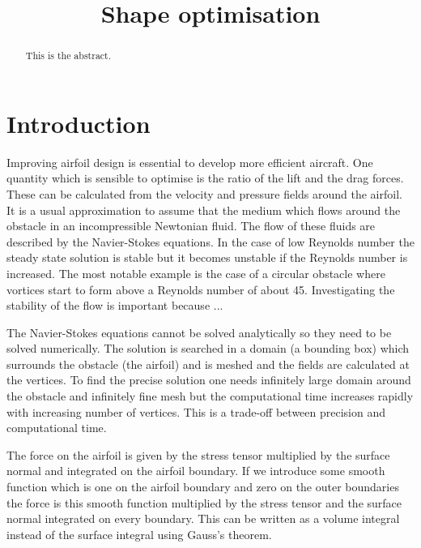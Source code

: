\documentclass[12pt, a4paper]{article}
\begin{document}
\captionsetup{justification=centering}
\title{Shape optimisation}
\maketitle
\begin{abstract}
    This is the abstract.
\end{abstract}
\section{Introduction}
        Improving airfoil design is essential to develop more efficient aircraft. One quantity which is sensible to optimise is the ratio of the lift and the drag forces. These can be calculated from the velocity and pressure fields around the airfoil. It is a usual approximation to assume that the medium which flows around the obstacle in an incompressible Newtonian fluid. The flow of these fluids are described by the Navier-Stokes equations. In the case of low Reynolds number the steady state solution is stable but it becomes unstable if the Reynolds number is increased. The most notable example is the case of a circular obstacle where vortices start to form above a Reynolds number of about 45. Investigating the stability of the flow is important because ... 
        
         The Navier-Stokes equations cannot be solved analytically so they need to be solved numerically. The solution is searched in a domain (a bounding box) which surrounds the obstacle (the airfoil) and is meshed and the fields are calculated at the vertices. To find the precise solution one needs infinitely large domain around the obstacle and infinitely fine mesh but the computational time increases rapidly with increasing number of vertices. This is a trade-off between precision and computational time.
        
        The force on the airfoil is given by the stress tensor multiplied by the surface normal and integrated on the airfoil boundary. If we introduce some smooth function which is one on the airfoil boundary and zero on the outer boundaries the force is this smooth function multiplied by the stress tensor and the surface normal integrated on every boundary. This can be written as a volume integral instead of the surface integral using Gauss's theorem. %
        
\end{document}
